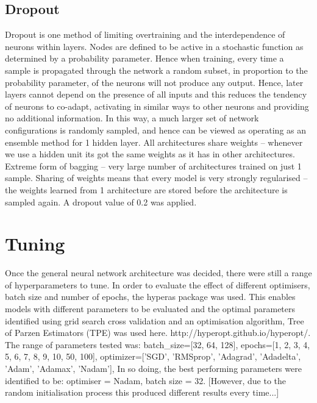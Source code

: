 \subsection{Dropout}
Dropout is one method of limiting overtraining and the interdependence of neurons within layers. Nodes are defined to be active in a stochastic function as determined by a probability parameter. Hence when training, every time a sample is propagated through the network a random subset, in proportion to the probability parameter, of the neurons will not produce any output. Hence, later layers cannot depend on the presence of all inputs and this reduces the tendency of neurons to co-adapt, activating in similar ways to other neurons and providing no additional information. In this way, a much larger set of network configurations is randomly sampled, and hence can be viewed as operating as an ensemble method for 1 hidden layer. All architectures share weights – whenever we use a hidden unit its got the same weights as it has in other architectures. Extreme form of bagging – very large number of architectures trained on just 1 sample. Sharing of weights means that every model is very strongly regularised – the weights learned from 1 architecture are stored before the architecture is sampled again. A dropout value of 0.2 was applied.

\section{Tuning}
Once the general neural network architecture was decided, there were still a range of hyperparameters to tune. In order to evaluate the effect of different optimisers, batch size and number of epochs, the hyperas package was used. This enables models with different parameters to be evaluated and the optimal parameters identified using grid search cross validation and an optimisation algorithm, Tree of Parzen Estimators (TPE) was used here. http://hyperopt.github.io/hyperopt/.
The range of parameters tested was: 
batch\_size=[32, 64, 128],
epochs=[1, 2, 3, 4, 5, 6, 7, 8, 9, 10, 50, 100],
optimizer=['SGD', 'RMSprop', 'Adagrad', 'Adadelta', 'Adam', 'Adamax', 'Nadam'],
In so doing, the best performing parameters were identified to be:
optimiser = Nadam, batch size = 32. [However, due to the random initialisation process this produced different results every time...]
